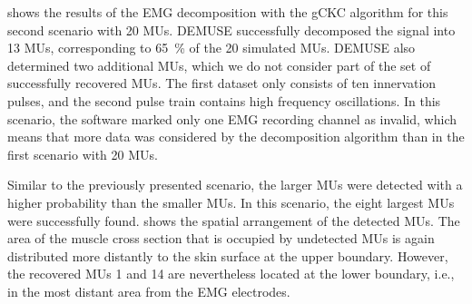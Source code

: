  shows the results of the EMG decomposition with the gCKC algorithm for this second scenario with 20 MUs. DEMUSE successfully decomposed the signal into 13 MUs, corresponding to \SI{65}{\percent} of the 20 simulated MUs. DEMUSE also determined two additional MUs, which we do not consider part of the set of successfully recovered MUs. The first dataset only consists of ten innervation pulses, and the second pulse train contains high frequency oscillations.
In this scenario, the software marked only one EMG recording channel as invalid, which means that more data was considered by the decomposition algorithm than in the first scenario with 20 MUs.

Similar to the previously presented scenario, the larger MUs were detected with a higher probability than the smaller MUs. In this scenario, the eight largest MUs were successfully found. 
 shows the spatial arrangement of the detected MUs. The area of the muscle cross section that is occupied by undetected MUs is again distributed more distantly to the skin surface at the upper boundary. However, the recovered MUs 1 and 14 are nevertheless located at the lower boundary, i.e., in the most distant area from the EMG electrodes. 


